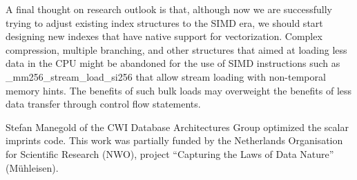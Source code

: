 \documentclass[sigconf]{acmart}
\begin{document}
A final thought on research outlook is that, although now we are successfully trying to adjust existing index structures to the SIMD era,
we should start designing new indexes that have native support for vectorization. Complex compression, multiple branching, and other structures
that aimed at loading less data in the CPU might be abandoned for the use of SIMD instructions such as \_mm256\_stream\_load\_si256 that allow
stream loading with non-temporal memory hints. The benefits of such bulk loads may overweight the benefits of less data transfer through control
flow statements.

\begin{acks}
Stefan Manegold of the CWI Database Architectures Group optimized the scalar imprints code.
This work was partially funded by the Netherlands Organisation for Scientific Research (NWO),
project ``Capturing the Laws of Data Nature'' (M\"uhleisen).
\end{acks}


 
\balance
\end{document}
